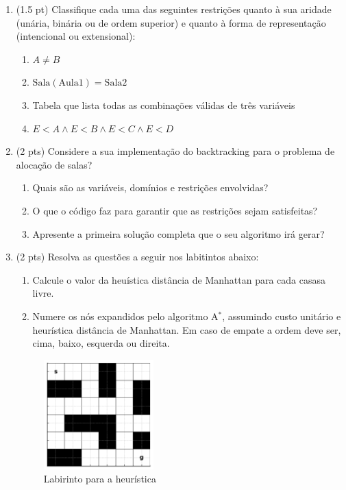 \documentclass[12pt]{article}
\begin{document}
\begin{enumerate}
    \item (1.5 pt) Classifique cada uma das seguintes restrições quanto à sua aridade (unária, binária ou de ordem superior) e quanto à forma de representação (intencional ou extensional):
    
    \begin{enumerate}[label=\alph*)]
        \item \( A \neq B \)
        \item \( \text{Sala}(\text{Aula1}) = \text{Sala2} \)
        \item Tabela que lista todas as combinações válidas de três variáveis
        \item \( E < A \land E < B \land E < C \land E < D \)
    \end{enumerate}

    \item (2 pts) Considere a sua implementação do backtracking para o problema de alocação de salas?
    
    \begin{enumerate}[label=\alph*)]
        \item Quais são as variáveis, domínios e restrições envolvidas?
        \item O que o código faz para garantir que as restrições sejam satisfeitas?
        \item Apresente a primeira solução completa que o seu algoritmo irá gerar?
    \end{enumerate}

    \item (2 pts) Resolva as questões a seguir nos labitintos abaixo:

    \begin{enumerate}
        \item Calcule o valor da heuística distância de Manhattan para cada casasa livre.
        \item Numere os nós expandidos pelo algoritmo A$^*$, assumindo custo unitário e heurística distância de Manhattan. Em caso de empate a ordem deve ser, cima, baixo, esquerda ou direita.
    \end{enumerate}

    \begin{figure}[h]
    \centering
    \includegraphics[width=0.4\textwidth]{labirinto.png}
    \caption{Labirinto para a heurística}
    \end{figure}


\end{enumerate}
\end{document}
